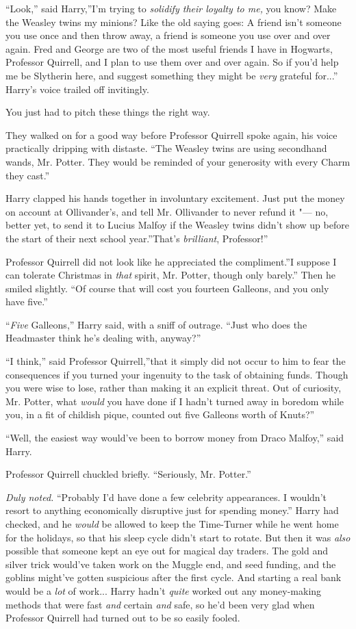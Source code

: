 ``Look,'' said Harry,''I'm trying to \emph{solidify their loyalty to
me,} you know? Make the Weasley twins my minions? Like the old saying
goes: A friend isn't someone you use once and then throw away, a friend
is someone you use over and over again. Fred and George are two of the
most useful friends I have in Hogwarts, Professor Quirrell, and I plan
to use them over and over again. So if you'd help me be Slytherin here,
and suggest something they might be \emph{very} grateful for...''
Harry's voice trailed off invitingly.

You just had to pitch these things the right way.

They walked on for a good way before Professor Quirrell spoke again, his
voice practically dripping with distaste. ``The Weasley twins are using
secondhand wands, Mr. Potter. They would be reminded of your generosity
with every Charm they cast.''

Harry clapped his hands together in involuntary excitement. Just put the
money on account at Ollivander's, and tell Mr. Ollivander to never
refund it "--- no, better yet, to send it to Lucius Malfoy if the Weasley
twins didn't show up before the start of their next school year.''That's
\emph{brilliant}, Professor!''

Professor Quirrell did not look like he appreciated the compliment.''I
suppose I can tolerate Christmas in \emph{that} spirit, Mr. Potter,
though only barely.'' Then he smiled slightly. ``Of course that will
cost you fourteen Galleons, and you only have five.''

``\emph{Five} Galleons,'' Harry said, with a sniff of outrage. ``Just who
does the Headmaster think he's dealing with, anyway?''

``I think,'' said Professor Quirrell,''that it simply did not occur to
him to fear the consequences if you turned your ingenuity to the task of
obtaining funds. Though you were wise to lose, rather than making it an
explicit threat. Out of curiosity, Mr. Potter, what \emph{would} you
have done if I hadn't turned away in boredom while you, in a fit of
childish pique, counted out five Galleons worth of Knuts?''

``Well, the easiest way would've been to borrow money from Draco
Malfoy,'' said Harry.

Professor Quirrell chuckled briefly. ``Seriously, Mr. Potter.''

\emph{Duly noted.} ``Probably I'd have done a few celebrity appearances.
I wouldn't resort to anything economically disruptive just for spending
money.'' Harry had checked, and he \emph{would} be allowed to keep the
Time-Turner while he went home for the holidays, so that his sleep cycle
didn't start to rotate. But then it was \emph{also} possible that
someone kept an eye out for magical day traders. The gold and silver
trick would've taken work on the Muggle end, and seed funding, and the
goblins might've gotten suspicious after the first cycle. And starting a
real bank would be a \emph{lot} of work... Harry hadn't
\emph{quite} worked out any money-making methods that were fast
\emph{and} certain \emph{and} safe, so he'd been very glad when
Professor Quirrell had turned out to be so easily fooled.

